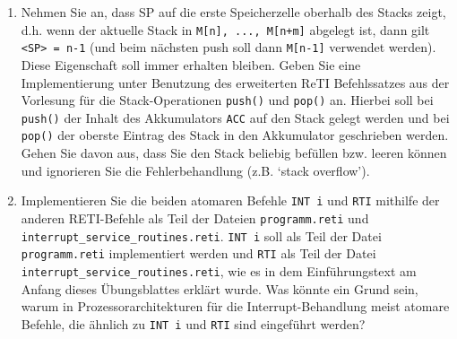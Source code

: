 \documentclass{article}
\begin{document}
\begin{enumerate}[label=\alph*)]
	\item Nehmen Sie an, dass SP auf die erste Speicherzelle oberhalb des Stacks zeigt, d.h. wenn der aktuelle Stack in \verb|M[n], ..., M[n+m]| abgelegt ist, dann gilt \verb|<SP> = n-1| (und beim nächsten push soll dann \verb|M[n-1]| verwendet werden). Diese Eigenschaft soll immer erhalten bleiben. Geben Sie eine Implementierung unter Benutzung des erweiterten ReTI Befehlssatzes aus der Vorlesung für die Stack-Operationen \verb|push()| und \verb|pop()| an. Hierbei soll bei \verb|push()| der Inhalt des Akkumulators \verb|ACC| auf den Stack gelegt werden und bei \verb|pop()| der oberste Eintrag des Stack in den Akkumulator geschrieben werden. Gehen Sie davon aus, dass Sie den Stack beliebig befüllen bzw. leeren können und ignorieren Sie die Fehlerbehandlung (z.B. ‘stack overflow’).
	\item Implementieren Sie die beiden atomaren Befehle \verb|INT i| und \verb|RTI| mithilfe der anderen RETI-Befehle als Teil der Dateien \verb|programm.reti| und \verb|interrupt_service_routines.reti|. \verb|INT i| soll als Teil der Datei \verb|programm.reti| implementiert werden und \verb|RTI| als Teil der Datei \verb|interrupt_service_routines.reti|, wie es in dem Einführungstext am Anfang dieses Übungsblattes erklärt wurde. Was könnte ein Grund sein, warum in Prozessorarchitekturen für die Interrupt-Behandlung meist atomare Befehle, die ähnlich zu \verb|INT i| und \verb|RTI| sind eingeführt werden? %
\end{enumerate}
\end{document}

